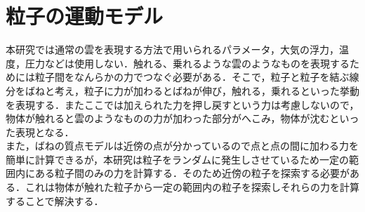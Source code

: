 \documentclass[11pt]{jreport}
\begin{document}
\section{粒子の運動モデル}
 本研究では通常の雲を表現する方法で用いられるパラメータ，大気の浮力，温度，圧力などは使用しない．触れる、乗れるような雲のようなものを表現するためには粒子間をなんらかの力でつなぐ必要がある．そこで，粒子と粒子を結ぶ線分をばねと考え，粒子に力が加わるとばねが伸び，触れる，乗れるといった挙動を表現する．またここでは加えられた力を押し戻すという力は考慮しないので，物体が触れると雲のようなものの力が加わった部分がへこみ，物体が沈むといった表現となる．\\
 また，ばねの質点モデルは近傍の点が分かっているので点と点の間に加わる力を簡単に計算できるが，本研究は粒子をランダムに発生しさせているため一定の範囲内にある粒子間のみの力を計算する．そのため近傍の粒子を探索する必要がある．これは物体が触れた粒子から一定の範囲内の粒子を探索しそれらの力を計算することで解決する．\\
　
\end{document}
